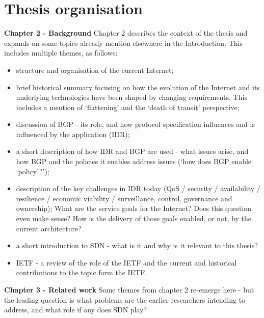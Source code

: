 \section{Thesis organisation}
\textbf{Chapter 2 - Background}
Chapter 2 describes the context of the thesis and expands on some topics already mention elsewhere in the Introduction.
This includes multiple themes, as follows:
\begin{itemize}[noitemsep,nolistsep]
	\item{structure and organisation of the current Internet;
	      }\item{brief historical summary focusing on how the evolution of the Internet and its underlying technologies have been shaped by changing requirements.
	            This includes a mention of ‘flattening’ and the ‘death of transit’ perspective;
	      }\item{discussion of BGP - its role, and how protocol specification influences and is influenced by the application (IDR);
	      }\item{a short description of how IDR and BGP are used - what issues arise, and how BGP and the policies it enables address issues (‘how does BGP enable ‘policy’?’);
	      }\item{description of the key challenges in IDR today (QoS / security / availability / resilience / economic viability / surveillance, control, governance and ownership);
	            What are the service goals for the Internet?  Does this question even make sense?  How is the delivery of those goals enabled, or not, by the current architecture?
	      }\item{a short introduction to SDN - what is it and why is it relevant to this thesis?
	      }\item{IETF - a review of the role of the IETF and the current and historical contributions to the topic form the IETF.}

	\medskip
\end{itemize}

\textbf{Chapter 3 - Related work}
Some themes from chapter 2 re-emerge here - but the leading question is what problems are the earlier researchers intending to address, and what role if any does SDN play?

\medskip

